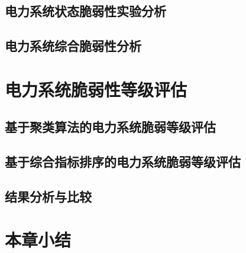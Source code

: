 \subsection{电力系统状态脆弱性实验分析}
\label{sec:singleAnalysis_status}





\subsection{电力系统综合脆弱性分析}
\label{sec:singleAnalysis}





\section{电力系统脆弱性等级评估}
\label{sec:multiAssessment}




\subsection{基于聚类算法的电力系统脆弱等级评估}
\label{sec:multiVSsingle}




\subsection{基于综合指标排序的电力系统脆弱等级评估}
\label{sec:multiAnalysis}





\subsection{结果分析与比较}




\section{本章小结}
\label{sec:sum5}



